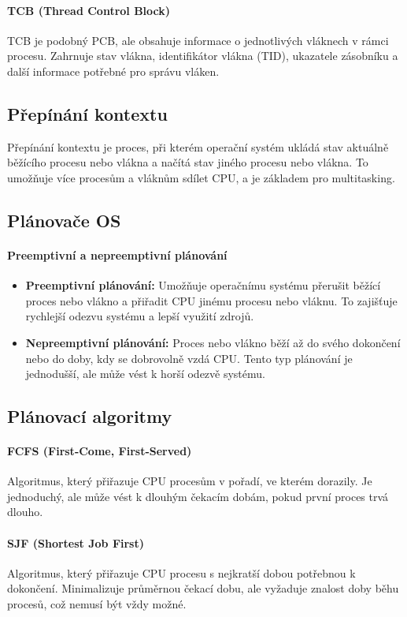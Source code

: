 \paragraph{TCB (Thread Control Block)}
TCB je podobný PCB, ale obsahuje informace o jednotlivých vláknech v rámci procesu. Zahrnuje stav vlákna, identifikátor vlákna (TID), ukazatele zásobníku a další informace potřebné pro správu vláken.

\subsection{Přepínání kontextu}
Přepínání kontextu je proces, při kterém operační systém ukládá stav aktuálně běžícího procesu nebo vlákna a načítá stav jiného procesu nebo vlákna. To umožňuje více procesům a vláknům sdílet CPU, a je základem pro multitasking.

\subsection{Plánovače OS}
\paragraph{Preemptivní a nepreemptivní plánování}
\begin{itemize}
\item \textbf{Preemptivní plánování:} Umožňuje operačnímu systému přerušit běžící proces nebo vlákno a přiřadit CPU jinému procesu nebo vláknu. To zajišťuje rychlejší odezvu systému a lepší využití zdrojů.
\item \textbf{Nepreemptivní plánování:} Proces nebo vlákno běží až do svého dokončení nebo do doby, kdy se dobrovolně vzdá CPU. Tento typ plánování je jednodušší, ale může vést k horší odezvě systému.
\end{itemize}

\subsection{Plánovací algoritmy}
\paragraph{FCFS (First-Come, First-Served)}
Algoritmus, který přiřazuje CPU procesům v pořadí, ve kterém dorazily. Je jednoduchý, ale může vést k dlouhým čekacím dobám, pokud první proces trvá dlouho.

\paragraph{SJF (Shortest Job First)}
Algoritmus, který přiřazuje CPU procesu s nejkratší dobou potřebnou k dokončení. Minimalizuje průměrnou čekací dobu, ale vyžaduje znalost doby běhu procesů, což nemusí být vždy možné.

